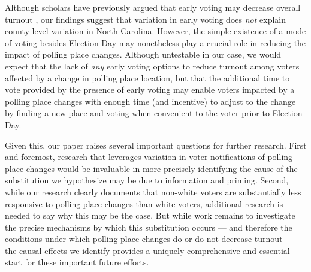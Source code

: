 \documentclass{cup_PSRM}
\begin{document}
Although scholars have previously argued that early voting may decrease overall turnout \citep{burden2014election,meredith2011convenience}, our findings suggest that variation in early voting does \emph{not} explain county-level variation in North Carolina.  However, the simple existence of a mode of voting besides Election Day may nonetheless play a crucial role in reducing the impact of polling place changes.  Although untestable in our case, we would expect that the lack of \emph{any} early voting options to reduce turnout among voters affected by a change in polling place location, but that the additional time to vote provided by the presence of early voting may enable voters impacted by a polling place changes with enough time (and incentive) to adjust to the change by finding a new place and voting when convenient to the voter prior to Election Day.

Given this, our paper raises several important questions for further research.  First and foremost, research that leverages variation in voter notifications of polling place changes would be invaluable in more precisely identifying the cause of the substitution we hypothesize may be due to information and priming. Second, while our research clearly documents that non-white voters are substantially less responsive to polling place changes than white voters, additional research is needed to say why this may be the case.  But while work remains to investigate the precise mechanisms by which this substitution occurs --- and therefore the conditions under which polling place changes do or do not decrease turnout --- the causal effects we identify provides a uniquely comprehensive and essential start for these important future efforts.










\singlespacing
\printbibliography

% 
% 
\end{document}
